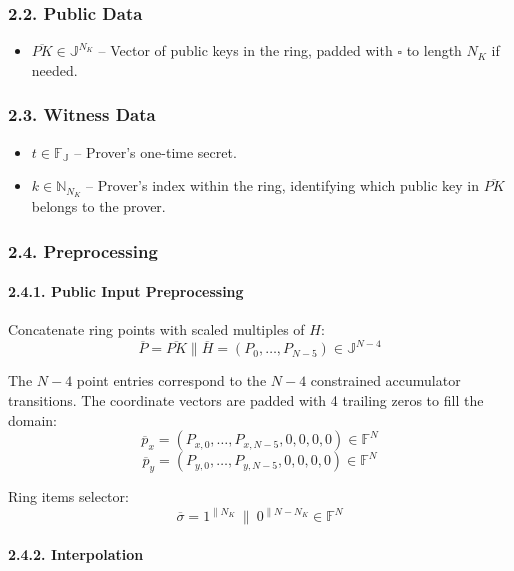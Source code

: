 \documentclass[
]{article}
\providecommand{\tightlist}{%
  \setlength{\itemsep}{0pt}\setlength{\parskip}{0pt}}
\begin{document}
\subsubsection{2.2. Public Data}\label{public-data}

\begin{itemize}
\tightlist
\item
  \(\overline{PK} \in \mathbb{J}^{N_K}\) -- Vector of public keys in the
  ring, padded with \(\square\) to length \(N_K\) if needed.
\end{itemize}

\subsubsection{2.3. Witness Data}\label{witness-data}

\begin{itemize}
\tightlist
\item
  \(t \in \mathbb{F_J}\) -- Prover's one-time secret.
\item
  \(k \in \mathbb{N}_{N_K}\) -- Prover's index within the ring,
  identifying which public key in \(\overline{PK}\) belongs to the
  prover.
\end{itemize}

\subsubsection{2.4. Preprocessing}\label{preprocessing}

\paragraph{2.4.1. Public Input
Preprocessing}\label{public-input-preprocessing}

Concatenate ring points with scaled multiples of \(H\):
\[\overline{P} = \overline{PK} \| \overline{H} = (P_0, \ldots, P_{N-5}) \in \mathbb{J}^{N-4}\]

The \(N - 4\) point entries correspond to the \(N - 4\) constrained
accumulator transitions. The coordinate vectors are padded with 4
trailing zeros to fill the domain:
\[\overline{p}_x = (P_{x,0}, \ldots, P_{x,N-5}, 0, 0, 0, 0) \in \mathbb{F}^N\]
\[\overline{p}_y = (P_{y,0}, \ldots, P_{y,N-5}, 0, 0, 0, 0) \in \mathbb{F}^N\]

Ring items selector:
\[\overline{\sigma} = 1^{\|N_K}\ \|\ 0^{\|N-N_K} \in \mathbb{F}^N\]

\paragraph{2.4.2. Interpolation}\label{interpolation}
\end{document}
